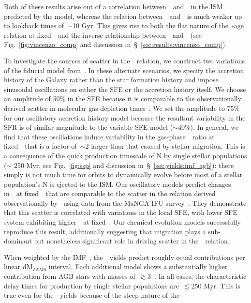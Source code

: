 \documentclass[ms.tex]{subfiles}
\begin{document}
Both of these results arise out of a correlation between~\nh~and~\feh~in the
ISM predicted by the model, whereas the relation between~\nh~and~\oh~is much
weaker up to lookback times of~$\sim$10 Gyr.
This gives rise to both the flat nature of the~\no-age relation at
fixed~\feh~and the inverse relationship between~\no~and~\ofe~(see
Fig.~\ref{fig:vincenzo_comp} and discussion
in~\S~\ref{sec:results:vincenzo_comp}).
\par
To investigate the sources of scatter in the~\ohno~relation, we construct two
variations of the fiducial model from~\citet{Johnson2021}.
In these alternate scenarios, we specify the accretion history of the
Galaxy rather than the star formation history and impose sinusoidal oscillations
on either the SFE or the accretion history itself.
We choose an amplitude of 50\% in the SFE because it is comparable to the
observationally derived scatter in molecular gas depletion
times~\citep{Tacconi2018}.
We set the amplitude to 75\% for our oscillatory accretion history model because
the resultant variability in the SFR is of similar magnitude to the variable
SFE model ($\sim$40\%).
In general, we find that these oscillations induce variability in the
gas-phase~\no~ratio at fixed~\oh~that is a factor of~$\sim$2 larger than that
caused by stellar migration.
This is a consequence of the quick production timescale of N by single stellar
populations ($\sim$ 250 Myr, see Fig.~\ref{fig:ssp} and discussion
in~\S~\ref{sec:yields:imf_agb}): there simply is not much time for orbits to
dynamically evolve before most of a stellar population's N is ejected to the
ISM.
Our oscillatory models predict changes in~\no~at fixed~\oh~that are comparable
to the scatter in the relation derived observationally by~\citet{Schaefer2020}
using data from the MaNGA IFU survey~\citep{Bundy2015}.
They demonstrate that this scatter is correlated with variations in the local
SFE, with lower SFE system exhibiting higher~\no~at fixed~\oh.
Our chemical evolution models successfully reproduce this result, additionally
suggesting that migration plays a sub-dominant but nonetheless significant
role in driving scatter in the~\ohno~relation.
\par
When weighted by the IMF~\citep{Kroupa2001}, the~\cristallo~yields predict
roughly equal contributions per linear dM$_\text{ZAMS}$ interval.
Each additional model shows a substantially higher contribution from AGB stars
with masses of~$\gtrsim$3~\msun.
In all cases, the characteristic delay times for production by single stellar
populations are~$\lesssim$250 Myr.
This is true even for the~\cristallo~yields because of the steep nature of the
\end{document}
